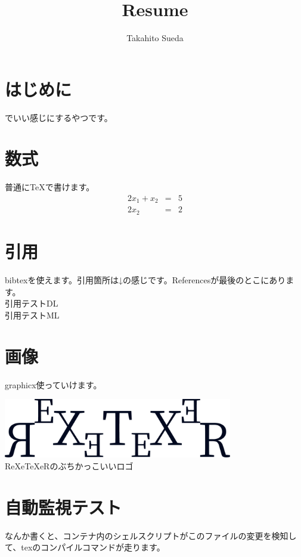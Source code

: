 \documentclass[a4paper]{article}
\begin{document}
  \title{Resume}
  \author{Takahito Sueda}
  \maketitle

  \section{はじめに}
  {\XeTeX} でいい感じにするやつです。

  \section{数式}
  普通に{\TeX}で書けます。
  \begin{eqnarray}
    2x_1 + x_2 & = & 5 \\
    2x_2 & = & 2
  \end{eqnarray}

  \section{引用}
  bibtexを使えます。引用箇所は↓の感じです。Referencesが最後のとこにあります。\\
  引用テストDL\cite{lecun2015deep} \\
  引用テストML\cite{michie1994machine}

  \section{画像}
  graphicx使っていけます。
  \begin{center}
    \includegraphics[width=10cm]{./img/logo.png} \\
    ReXeTeXeRのぶちかっこいいロゴ
  \end{center}

  \section{自動監視テスト}
  なんか書くと、コンテナ内のシェルスクリプトがこのファイルの変更を検知して、texのコンパイルコマンドが走ります。

  
  
\end{document}
